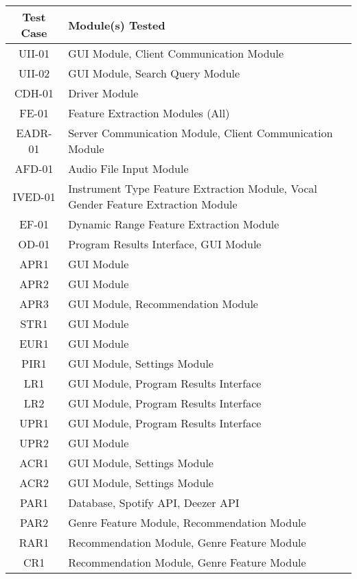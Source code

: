 \documentclass[12pt, titlepage]{article}
\begin{document}
\begin{table}[H]
  \centering
  \renewcommand{\arraystretch}{1.2} %
  \begin{tabularx}{\textwidth}{|c|X|} %
      \hline
      \textbf{Test Case} & \textbf{Module(s) Tested} \\
      \hline
      UII-01 & GUI Module, Client Communication Module \\ 
      UII-02 & GUI Module, Search Query Module \\
      CDH-01 & Driver Module \\
      FE-01 & Feature Extraction Modules (All) \\
      EADR-01 & Server Communication Module, Client Communication Module \\
      AFD-01 & Audio File Input Module \\
      IVED-01 & Instrument Type Feature Extraction Module, Vocal Gender Feature Extraction Module \\
      EF-01 & Dynamic Range Feature Extraction Module \\
      OD-01 & Program Results Interface, GUI Module \\
      APR1 & GUI Module \\
      APR2 & GUI Module \\
      APR3 & GUI Module, Recommendation Module \\
      STR1 & GUI Module \\
      EUR1 & GUI Module \\
      PIR1 & GUI Module, Settings Module \\
      LR1 & GUI Module, Program Results Interface \\
      LR2 & GUI Module, Program Results Interface \\
      UPR1 & GUI Module, Program Results Interface \\
      UPR2 & GUI Module \\
      ACR1 & GUI Module, Settings Module \\
      ACR2 & GUI Module, Settings Module \\
      PAR1 & Database, Spotify API, Deezer API \\
      PAR2 & Genre Feature Module, Recommendation Module \\
      RAR1 & Recommendation Module, Genre Feature Module \\
      CR1 & Recommendation Module, Genre Feature Module \\

\end{tabularx}
\end{table}
\end{document}
